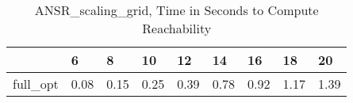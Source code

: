 \begin{table}
\caption{ANSR\_scaling\_grid, Time in Seconds to Compute Reachability}
\label{ANSR_scaling_grid_states_time}
\begin{tabular}{lllllllll}
\toprule
 & 6 & 8 & 10 & 12 & 14 & 16 & 18 & 20 \\
\midrule
full\_opt & 0.08 & 0.15 & 0.25 & 0.39 & 0.78 & 0.92 & 1.17 & 1.39 \\
\bottomrule
\end{tabular}
\end{table}
